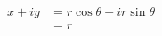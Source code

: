 \documentclass[preview]{standalone}
\begin{document}
\begin{align*}
x + iy &= r\cos\theta + ir\sin\theta \\ &=r
\end{align*}
\end{document}
